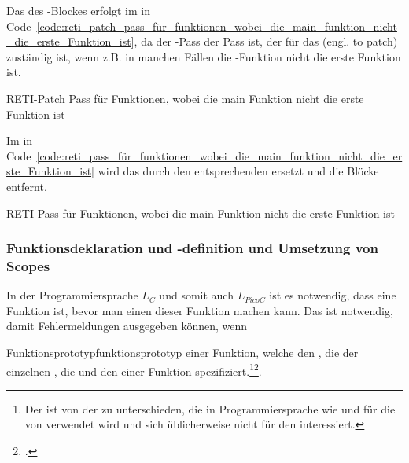 Das  des -Blockes erfolgt im  in Code~\ref{code:reti_patch_pass_für_funktionen_wobei_die_main_funktion_nicht_die_erste_Funktion_ist}, da der -Pass der Pass ist, der für das  (engl. to patch) zuständig ist, wenn z.B. in manchen Fällen die -Funktion nicht die erste Funktion ist.

\begin{code}
  \centering
  \caption{RETI-Patch Pass für Funktionen, wobei die main Funktion nicht die erste Funktion ist}
  \label{code:reti_patch_pass_für_funktionen_wobei_die_main_funktion_nicht_die_erste_Funktion_ist}
\end{code}

Im  in Code~\ref{code:reti_pass_für_funktionen_wobei_die_main_funktion_nicht_die_erste_Funktion_ist} wird das  durch den entsprechenden   ersetzt und die Blöcke entfernt.

\begin{code}
  \centering
  \caption{RETI Pass für Funktionen, wobei die main Funktion nicht die erste Funktion ist}
  \label{code:reti_pass_für_funktionen_wobei_die_main_funktion_nicht_die_erste_Funktion_ist}
\end{code}

\subsubsection{Funktionsdeklaration und -definition und Umsetzung von Scopes}

In der Programmiersprache $L_C$ und somit auch $L_{PicoC}$ ist es notwendig, dass eine Funktion  ist, bevor man einen  dieser Funktion machen kann. Das ist notwendig, damit Fehlermeldungen ausgegeben können, wenn

\begin{Definition}{Funktionsprototyp}{funktionsprototyp}
   einer Funktion, welche den , die  der einzelnen , die  und den  einer Funktion spezifiziert.\footnote{Der  ist von der  zu unterschieden, die in Programmiersprache wie  und  für die  von  verwendet wird und sich üblicherweise nicht für den  interessiert.}\footcite{noauthor_what_nodate-4}.
\end{Definition}

